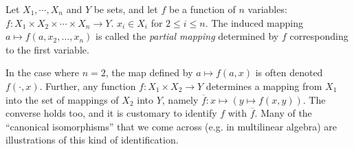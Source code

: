 \documentclass[12pt]{article}
\newcommand{\<}{\langle}
\renewcommand{\>}{\rangle}
\begin{document}
Let $X_1, \cdots, X_n$ and $Y$ be sets, and let $f$ be a function of $n$ variables:  $f:X_1\times X_2\times\cdots\times X_n\to Y$.   $x_i\in X_i$ for $2\leq i\leq n$.  The induced mapping $a\mapsto f(a,x_2,\ldots,x_n)$ is called the \emph{partial mapping} determined by $f$ corresponding to the first variable.

In the case where $n=2$, the map defined by $a\mapsto f(a,x)$ is often denoted $f(\cdot,x)$.  Further, any function $f:X_1\times X_2\to Y$ determines a mapping
from $X_1$ into the set of mappings of $X_2$ into $Y$, namely
$\overline{f}:x\mapsto(y\mapsto f(x,y))$.
The converse holds too, and it is customary to identify $f$ with
$\overline{f}$.  Many of the ``canonical isomorphisms'' that we come across (e.g. in multilinear algebra) are illustrations of this kind of identification.
\end{document}

